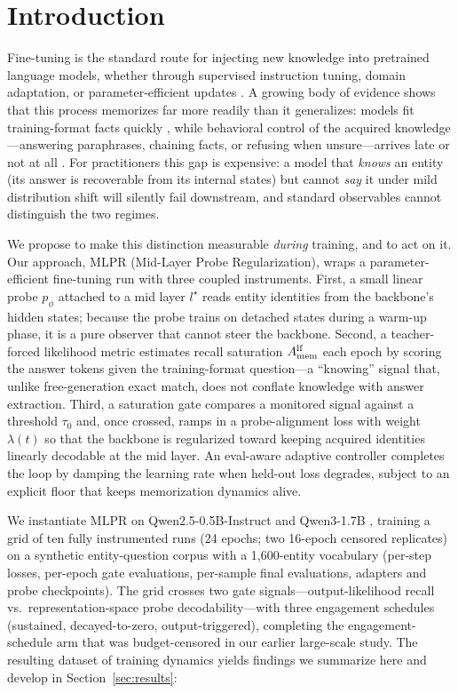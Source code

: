 \section{Introduction}
\label{sec:intro}

Fine-tuning is the standard route for injecting new knowledge into pretrained
language models, whether through supervised instruction tuning, domain
adaptation, or parameter-efficient updates \citep{hu2022lora}. A growing body
of evidence shows that this process memorizes far more readily than it
generalizes: models fit training-format facts quickly
\citep{tirumala2022memorization,carlini2023quantifying}, while behavioral
control of the acquired knowledge---answering paraphrases, chaining facts,
or refusing when unsure---arrives late or not at all
\citep{kandpal2023large,allen2023physics}. For practitioners this gap is
expensive: a model that \emph{knows} an entity (its answer is recoverable
from its internal states) but cannot \emph{say} it under mild distribution
shift will silently fail downstream, and standard observables cannot
distinguish the two regimes.

We propose to make this distinction measurable \emph{during} training, and
to act on it. Our approach, MLPR (Mid-Layer Probe Regularization), wraps a
parameter-efficient fine-tuning run with three coupled instruments. First,
a small linear probe $p_\phi$ attached to a mid layer $l^\star$ reads
entity identities from the backbone's hidden states; because the probe
trains on detached states during a warm-up phase, it is a pure observer
that cannot steer the backbone. Second, a teacher-forced likelihood metric
estimates recall saturation $A_{\mathrm{mem}}^{\mathrm{lf}}$ each epoch by scoring the answer
tokens given the training-format question---a ``knowing'' signal that, unlike
free-generation exact match, does not conflate knowledge with answer
extraction. Third, a saturation gate compares a monitored signal against a
threshold $\tau_0$ and, once crossed, ramps in a probe-alignment loss with
weight $\lambda(t)$ so that the backbone is regularized toward keeping acquired
identities linearly decodable at the mid layer. An eval-aware adaptive
controller completes the loop by damping the learning rate when held-out
loss degrades, subject to an explicit floor that keeps memorization
dynamics alive.

We instantiate MLPR on Qwen2.5-0.5B-Instruct and Qwen3-1.7B
\citep{qwen2024qwen25,qwen3}, training a grid of ten fully
instrumented runs (24 epochs; two 16-epoch censored replicates) on a
synthetic entity-question corpus with
a 1{,}600-entity vocabulary (per-step losses, per-epoch gate
evaluations, per-sample final evaluations, adapters and probe
checkpoints). The grid crosses two gate signals---output-likelihood
recall vs.\ representation-space probe decodability---with three
engagement schedules (sustained, decayed-to-zero, output-triggered),
completing the engagement-schedule arm that was budget-censored in our
earlier large-scale study. The resulting dataset of training dynamics
yields findings we summarize here and develop in
Section~\ref{sec:results}:

